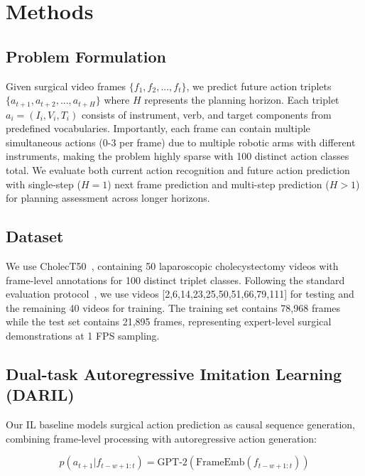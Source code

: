 \documentclass[runningheads]{llncs}
\begin{document}
\section{Methods}

\subsection{Problem Formulation}

Given surgical video frames $\{f_1, f_2, ..., f_t\}$, we predict future action triplets $\{a_{t+1}, a_{t+2}, ..., a_{t+H}\}$ where $H$ represents the planning horizon. Each triplet $a_i = (I_i, V_i, T_i)$ consists of instrument, verb, and target components from predefined vocabularies. Importantly, each frame can contain multiple simultaneous actions (0-3 per frame) due to multiple robotic arms with different instruments, making the problem highly sparse with 100 distinct action classes total. We evaluate both current action recognition and future action prediction with single-step ($H=1$) next frame prediction and multi-step prediction ($H>1$) for planning assessment across longer horizons.

\subsection{Dataset}

We use CholecT50~\cite{nwoye2022cholect50}, containing 50 laparoscopic cholecystectomy videos with frame-level annotations for 100 distinct triplet classes. Following the standard evaluation protocol~\cite{nwoye2022data}, we use videos [2,6,14,23,25,50,51,66,79,111] for testing and the remaining 40 videos for training. The training set contains 78,968 frames while the test set contains 21,895 frames, representing expert-level surgical demonstrations at 1 FPS sampling.

\subsection{Dual-task Autoregressive Imitation Learning (DARIL)}

Our IL baseline models surgical action prediction as causal sequence generation, combining frame-level processing with autoregressive action generation:

\begin{equation}
p(a_{t+1}|f_{t-w+1:t}) = \text{GPT-2}(\text{FrameEmb}(f_{t-w+1:t}))
\end{equation}
\end{document}

